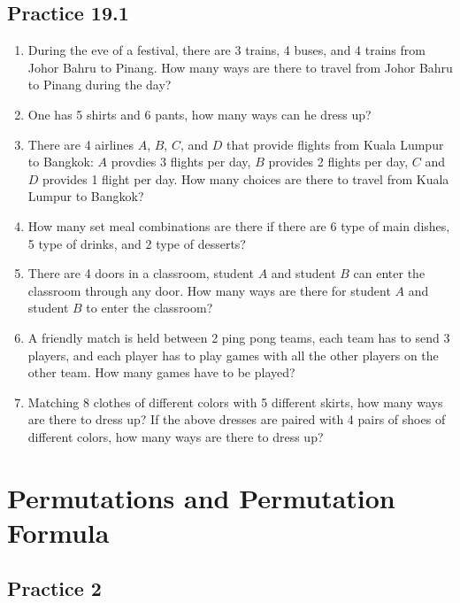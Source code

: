 \documentclass{report}
\begin{document}
\begin{multicols}{2}
  \subsection{Practice 19.1}
  \begin{enumerate}
    \item During the eve of a festival, there are 3 trains, 4 buses, and 4 trains from
          Johor Bahru to Pinang. How many ways are there to travel from Johor Bahru to
          Pinang during the day?

    \item One has 5 shirts and 6 pants, how many ways can he dress up?

    \item There are 4 airlines $A$, $B$, $C$, and $D$ that provide flights from Kuala
          Lumpur to Bangkok: $A$ provdies 3 flights per day, $B$ provides 2 flights per
          day, $C$ and $D$ provides 1 flight per day. How many choices are there to
          travel from Kuala Lumpur to Bangkok?

    \item How many set meal combinations are there if there are 6 type of main dishes, 5
          type of drinks, and 2 type of desserts?

    \item There are 4 doors in a classroom, student $A$ and student $B$ can enter the
          classroom through any door. How many ways are there for student $A$ and student
          $B$ to enter the classroom?

    \item A friendly match is held between 2 ping pong teams, each team has to send 3
          players, and each player has to play games with all the other players on the
          other team. How many games have to be played?

    \item Matching 8 clothes of different colors with 5 different skirts, how many ways
          are there to dress up? If the above dresses are paired with 4 pairs of shoes of
          different colors, how many ways are there to dress up?

  \end{enumerate}

  \section{Permutations and Permutation Formula}

  \subsection{Practice 2}


\end{multicols}
\end{document}

